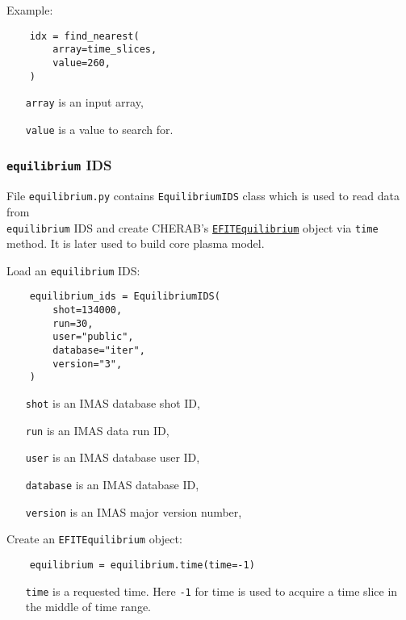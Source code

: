 \documentclass[../../main.tex]{subfiles}
\begin{document}
Example:
\begin{verbatim}
    idx = find_nearest(
        array=time_slices,
        value=260,
    )
\end{verbatim}

\begin{itemize}[align=left]
    \item[\texttt{array}] is an input array,
    \item[\texttt{value}] is a value to search for.
\end{itemize}

\subsubsection{\texttt{equilibrium} IDS}%
\label{sec:equilibrium_ids}

File \texttt{equilibrium.py} contains \texttt{EquilibriumIDS} class which is used to read data from \\ \texttt{equilibrium} IDS and create CHERAB's \href{https://cherab.github.io/documentation/plasmas/equilibrium.html?highlight=efit#cherab.tools.equilibrium.efit.EFITEquilibrium}{\texttt{EFITEquilibrium}} object via \texttt{time} method. It is later used to build core plasma model.

Load an \texttt{equilibrium} IDS:
\begin{verbatim}
    equilibrium_ids = EquilibriumIDS(
        shot=134000,
        run=30,
        user="public",
        database="iter",
        version="3",
    )
\end{verbatim}

\begin{itemize}[align=left]
    \item[\texttt{shot}] is an IMAS database shot ID,
    \item[\texttt{run}] is an IMAS data run ID,
    \item[\texttt{user}] is an IMAS database user ID,
    \item[\texttt{database}] is an IMAS database ID,
    \item[\texttt{version}] is an IMAS major version number,
\end{itemize}

Create an \texttt{EFITEquilibrium} object:
\begin{verbatim}
    equilibrium = equilibrium.time(time=-1)
\end{verbatim}

\begin{itemize}[align=left]
    \item[\texttt{time}] is a requested time. Here \texttt{-1} for time is used to acquire a time slice in the middle of time range.
\end{itemize}
\end{document}
